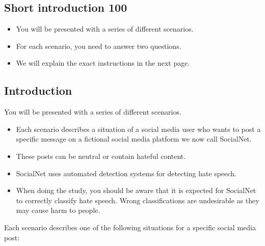 \subsection{Short introduction 100}
\begin{itemize}
    \item You will be presented with a series of different scenarios.
    \item For each scenario, you need to answer two questions.
    \item We will explain the exact instructions in the next page.
\end{itemize}


\subsection{Introduction}
You will be presented with a series of different scenarios.
\begin{itemize}
    \item Each scenario describes a situation of a social media user who wants to post a specific message on a fictional social media platform we now call SocialNet.
    \item These posts can be neutral or contain hateful content.
    \item SocialNet uses automated detection systems for detecting hate speech.
    \item When doing the study, you should be aware that it is expected for SocialNet to correctly classify hate speech. Wrong classifications are undesirable as they may cause harm to people.
\end{itemize}

\begin{flushleft}
    Each scenario describes one of the following situations for a specific social media post:
\end{flushleft}

